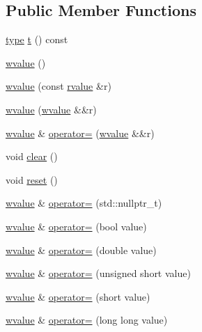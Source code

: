 \subsection*{Public Member Functions}
\begin{DoxyCompactItemize}
\item 
\hyperlink{namespacecrow_1_1json_adb9569a402d1b289a75025c8c96e5d99}{type} \hyperlink{classcrow_1_1json_1_1wvalue_ae92eda8ed30f6360b46bf9f4f30074ec}{t} () const 
\item 
\hyperlink{classcrow_1_1json_1_1wvalue_a3bd09f79662afa14d7da1016e0da672d}{wvalue} ()
\item 
\hyperlink{classcrow_1_1json_1_1wvalue_a1813a29de56af96789cc76b8cdb0dbbe}{wvalue} (const \hyperlink{classcrow_1_1json_1_1rvalue}{rvalue} \&r)
\item 
\hyperlink{classcrow_1_1json_1_1wvalue_a780a992b87a23470b99ef4b594ffd1ba}{wvalue} (\hyperlink{classcrow_1_1json_1_1wvalue}{wvalue} \&\&r)
\item 
\hyperlink{classcrow_1_1json_1_1wvalue}{wvalue} \& \hyperlink{classcrow_1_1json_1_1wvalue_aaafb5db799a2eff74cfcaddd87ebe053}{operator=} (\hyperlink{classcrow_1_1json_1_1wvalue}{wvalue} \&\&r)
\item 
void \hyperlink{classcrow_1_1json_1_1wvalue_af46596998d8e639a23b401e951297b63}{clear} ()
\item 
void \hyperlink{classcrow_1_1json_1_1wvalue_ab13538ab6037cf427ed225b94d703ce9}{reset} ()
\item 
\hyperlink{classcrow_1_1json_1_1wvalue}{wvalue} \& \hyperlink{classcrow_1_1json_1_1wvalue_a8e901650c163d7ae0c1359931d578ca2}{operator=} (std\-::nullptr\-\_\-t)
\item 
\hyperlink{classcrow_1_1json_1_1wvalue}{wvalue} \& \hyperlink{classcrow_1_1json_1_1wvalue_abda777617312d286b38f489055cf7907}{operator=} (bool value)
\item 
\hyperlink{classcrow_1_1json_1_1wvalue}{wvalue} \& \hyperlink{classcrow_1_1json_1_1wvalue_a5571fb38b397935150885ff7960a6ac6}{operator=} (double value)
\item 
\hyperlink{classcrow_1_1json_1_1wvalue}{wvalue} \& \hyperlink{classcrow_1_1json_1_1wvalue_ab1ef13ccac07c1b858e7f6be24274e64}{operator=} (unsigned short value)
\item 
\hyperlink{classcrow_1_1json_1_1wvalue}{wvalue} \& \hyperlink{classcrow_1_1json_1_1wvalue_a387243a191d80d728338bd1105812762}{operator=} (short value)
\item 
\hyperlink{classcrow_1_1json_1_1wvalue}{wvalue} \& \hyperlink{classcrow_1_1json_1_1wvalue_a80b6297e11ab7dfa3ca9819281cd337d}{operator=} (long long value)

\end{DoxyCompactItemize}
